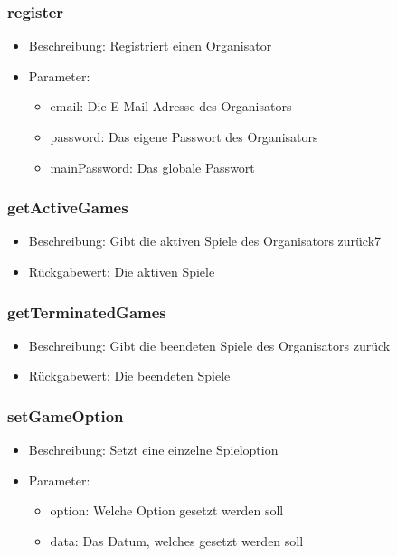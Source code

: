 \documentclass[a4paper]{scrreprt}
\begin{document}
    \subsubsection{register}
    \begin{itemize}
        \item Beschreibung: Registriert einen Organisator
        \item Parameter:
        \begin{itemize}
            \item email: Die E-Mail-Adresse des Organisators
            \item password: Das eigene Passwort des Organisators
            \item mainPassword: Das globale Passwort
        \end{itemize}
    \end{itemize}
    \subsubsection{getActiveGames}
    \begin{itemize}
        \item Beschreibung: Gibt die aktiven Spiele des Organisators zurück7
        \item Rückgabewert: Die aktiven Spiele
    \end{itemize}
    \subsubsection{getTerminatedGames}
    \begin{itemize}
        \item Beschreibung: Gibt die beendeten Spiele des Organisators zurück
        \item Rückgabewert: Die beendeten Spiele
    \end{itemize}
    \subsubsection{setGameOption}
    \begin{itemize}
        \item Beschreibung: Setzt eine einzelne Spieloption
        \item Parameter:
        \begin{itemize}
            \item option: Welche Option gesetzt werden soll
            \item data: Das Datum, welches gesetzt werden soll
        \end{itemize}
    \end{itemize}
\end{document}
